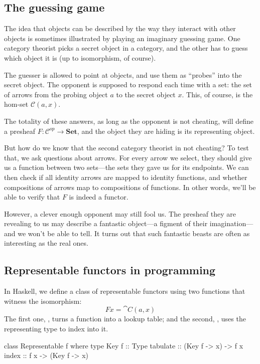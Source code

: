 \documentclass[DaoFP]{subfiles}
\begin{document}
\subsection{The guessing game}

The idea that objects can be described by the way they interact with other objects is sometimes illustrated by playing an imaginary guessing game. One category theorist picks a secret object in a category, and the other has to guess which object it is (up to isomorphism, of course). 

The guesser is allowed to point at objects, and use them as ``probes'' into the secret object. The opponent is supposed to respond each time with a set: the set of arrows from the probing object $a$ to the secret object $x$. This, of course, is the hom-set $\mathcal{C}(a, x)$. 

The totality of these answers, as long as the opponent is not cheating, will define a presheaf $F \colon \mathcal{C}^{op} \to \mathbf{Set}$, and the object they are hiding is its representing object. 

But how do we know that the second category theorist in not cheating? To test that, we ask questions about arrows. For every arrow we select, they should give us a function between two sets---the sets they gave us for its endpoints. We can then check if all identity arrows are mapped to identity functions, and whether compositions of arrows map to compositions of functions. In other words, we'll be able to verify that $F$ is indeed a functor. 

However, a clever enough opponent may still fool us. The presheaf they are revealing to us may describe a fantastic object---a figment of their imagination---and we won't be able to tell. It turns out that such fantastic beasts are often as interesting as the real ones. 

\subsection{Representable functors in programming}

In Haskell, we define a class of representable functors using two functions that witness the isomorphism: 
\[ F x = \cat C(a, x) \]
The first one, , turns a function into a lookup table; and the second, , uses the representing type  to index into it.

\begin{haskell}
class Representable f where
  type Key f :: Type
  tabulate :: (Key f -> x) -> f x
  index    :: f x -> (Key f -> x)
\end{haskell}
\end{document}
